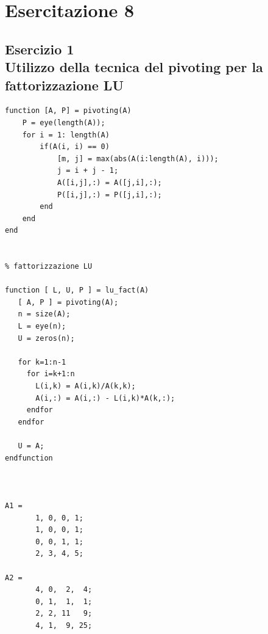 \documentclass{article}
\begin{document}
\newpage
\section{ Esercitazione 8}


\subsection{Esercizio 1 \\ Utilizzo della tecnica del pivoting per la fattorizzazione LU}
\begin{lstlisting}
function [A, P] = pivoting(A)
    P = eye(length(A));
    for i = 1: length(A)
        if(A(i, i) == 0)
            [m, j] = max(abs(A(i:length(A), i)));
            j = i + j - 1;
            A([i,j],:) = A([j,i],:);
            P([i,j],:) = P([j,i],:);
        end
    end
end


% fattorizzazione LU

function [ L, U, P ] = lu_fact(A)
   [ A, P ] = pivoting(A);
   n = size(A);
   L = eye(n);
   U = zeros(n);

   for k=1:n-1
     for i=k+1:n
       L(i,k) = A(i,k)/A(k,k);
       A(i,:) = A(i,:) - L(i,k)*A(k,:);
     endfor
   endfor

   U = A;
endfunction



A1 =
       1, 0, 0, 1; 
       1, 0, 0, 1; 
       0, 0, 1, 1;
       2, 3, 4, 5; 

A2 =
       4, 0,  2,  4; 
       0, 1,  1,  1;
       2, 2, 11   9; 
       4, 1,  9, 25; 	
\end{lstlisting}

\newpage
\end{document}
